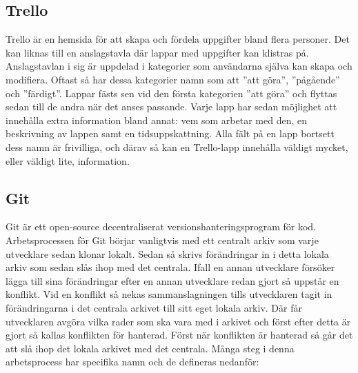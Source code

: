 \subsection*{Trello}
Trello är en hemsida för att skapa och fördela uppgifter bland flera personer.\cite{Trello} Det kan liknas till en anslagstavla där lappar med uppgifter kan klistras på. Anslagstavlan i sig är uppdelad i kategorier som användarna själva kan skapa och modifiera. Oftast så har dessa kategorier namn som att ''att göra'', ''pågående'' och ''färdigt''. Lappar fästs sen vid den första kategorien ''att göra'' och flyttas sedan till de andra när det anses passande. Varje lapp har sedan möjlighet att innehålla extra information bland annat: vem som arbetar med den, en beskrivning av lappen samt en tidsuppskattning. Alla fält på en lapp bortsett dess namn är frivilliga, och därav så kan en Trello-lapp innehålla väldigt mycket, eller väldigt lite, information.

\subsection*{Git}
Git är ett open-source decentraliserat versionshanteringsprogram för kod.\cite{Git} Arbetsprocessen för Git börjar vanligtvis med ett centralt arkiv som varje utvecklare sedan klonar lokalt. Sedan så skrivs förändringar in i detta lokala arkiv som sedan slås ihop med det centrala. Ifall en annan utvecklare försöker lägga till sina förändringar efter en annan utvecklare redan gjort så uppstår en konflikt. Vid en konflikt så nekas sammanslagningen tills utvecklaren tagit in förändringarna i det centrala arkivet till sitt eget lokala arkiv. Där får utvecklaren avgöra vilka rader som ska vara med i arkivet och först efter detta är gjort så kallas konflikten för hanterad. Först när konflikten är hanterad så går det att slå ihop det lokala arkivet med det centrala. Många steg i denna arbetsprocess har specifika namn och de defineras nedanför:

